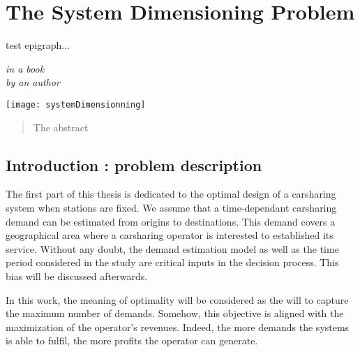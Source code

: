 \chapter{The System Dimensioning Problem} \label{chap:sdp}
\epigraph{test epigraph...}{\textit{in a book \\ by an author}}
\begin{bibunit}[ieeetr]
\minitoc
\vspace{2cm}

\begin{minipage}[c]{0.3\linewidth}
\texttt{[image: systemDimensionning]}
\end{minipage}
\hfill
\begin{minipage}[c]{0.7\linewidth}
\begin{abstract}
The abstract
\end{abstract}
\end{minipage}

\newpage
\section{Introduction : problem description}
The first part of this thesis is dedicated to the optimal design of a carsharing system when stations are fixed.
We assume that a time-dependant carsharing demand can be estimated from origins to destinations.
This demand covers a geographical area where a carsharing operator is interested to established its service.
Without any doubt, the demand estimation model as well as the time period considered in the study are critical inputs in the decision process.
This bias will be discussed afterwards.

In this work, the meaning of optimality will be considered as the will to capture the maximum number of demands.
Somehow, this objective is aligned with the maximization of the operator's revenues.
Indeed, the more demands the systems is able to fulfil, the more profits the operator can generate.


\end{bibunit}
